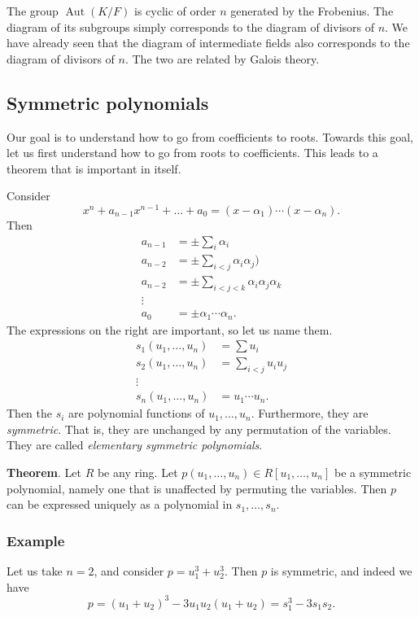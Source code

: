 \documentclass[11pt]{article}
\begin{document}
\begin{enumerate}
The group \(\operatorname{Aut}(K/F)\) is cyclic of order \(n\) generated by the Frobenius.
The diagram of its subgroups simply corresponds to the diagram of divisors of \(n\).
We have already seen that the diagram of intermediate fields also corresponds to the diagram of divisors of \(n\).
The two are related by Galois theory.
\end{enumerate}
\subsection{Symmetric polynomials}
\label{sec:orgf62590f}
Our goal is to understand how to go from coefficients to roots.
Towards this goal, let us first understand how to go from roots to coefficients.
This leads to a theorem that is important in itself.

Consider
\[ x^{n} + a_{n-1}x^{n-1} + \dots + a_{0} = (x-\alpha_1) \cdots (x-\alpha_n).\]
Then
\begin{align*}
a_{n-1} &= \pm \sum_{i} \alpha_{i}\\
a_{n-2} &= \pm \sum_{i < j} \alpha_{i} \alpha_{j})\\
a_{n-2} &= \pm \sum_{i<j<k} \alpha_{i}\alpha_{j}\alpha_{k}\\
\vdots\\
a_{0} &= \pm \alpha_{1} \cdots \alpha_{n}.
\end{align*}
The expressions on the right are important, so let us name them.
\begin{align*}
 s_{1}(u_{1}, \dots, u_{n}) &= \sum u_{i}\\
 s_{2}(u_{1}, \dots,u_{n}) &= \sum_{i<j}u_{i}u_{j}\\
\vdots \\
s_{n}(u_{1}, \dots, u_{n}) &= u_{1} \cdots u_{n}.
\end{align*}
Then the \(s_i\) are polynomial functions of \(u_{1}, \dots, u_{n}\).
Furthermore, they are \emph{symmetric}.
That is, they are unchanged by any permutation of the variables.
They are called \emph{elementary symmetric polynomials}.

\textbf{Theorem}. Let \(R\) be any ring.  Let \(p(u_{1}, \dots, u_{n}) \in R[u_{1}, \dots, u_{n}]\) be a symmetric polynomial, namely one that is unaffected by permuting the variables.  Then \(p\) can be expressed uniquely as a polynomial in \(s_{1}, \dots, s_{n}\).
\subsubsection{Example}
\label{sec:orga9d2a8c}
Let us take \(n = 2\), and consider \(p = u_{1}^3 + u_{2}^3\).
Then \(p\) is symmetric, and indeed we have
\[ p = (u_{1}+u_{2})^3 - 3u_{1}u_{2}(u_{1}+u_{2}) = s_{1}^3-3s_{1}s_{2}.\]
\end{document}
